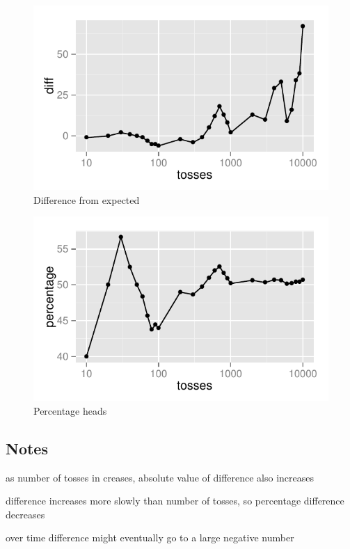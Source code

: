 \documentclass[portrait]{exam}
\begin{document}
  \begin{figure}[H]
    \centering
    \includegraphics{figures/diff.pdf}
    \caption{Difference from expected}
    \label{fig:diff}
  \end{figure}

  \begin{figure}[H]
    \centering
    \includegraphics{figures/percentage.pdf}
    \caption{Percentage heads}
    \label{fig:percentage}
  \end{figure}

  \subsection{Notes}
  \begin{itemize*}
    \item as number of tosses in creases, absolute value of difference also
      increases
    \item difference increases more slowly than number of tosses, so percentage
      difference decreases
    \item over time difference might eventually go to a large negative number
  \end{itemize*}
\end{document}
